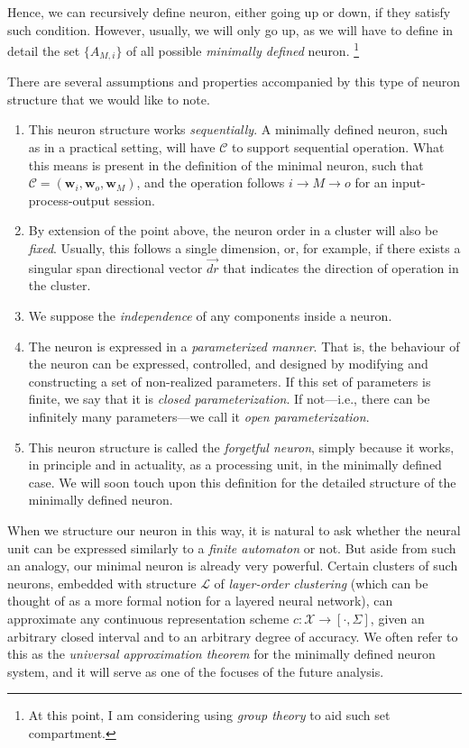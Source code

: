 

Hence, we can recursively define neuron, either going up or down, if they satisfy such condition. However, usually, we will only go up, as we will have to define in detail the set $\{ A_{M,i} \}$ of all possible \textit{minimally defined} neuron. \footnote{At this point, I am considering using \textit{group theory} to aid such set compartment.}

There are several assumptions and properties accompanied by this type of neuron structure that we would like to note.
\begin{enumerate}
    \item This neuron structure works \textit{sequentially}. A minimally defined neuron, such as in a practical setting, will have $\mathcal{C}$ to support sequential operation. What this means is present in the definition of the minimal neuron, such that $\mathcal{C} = (\mathbf{w}_{i}, \mathbf{w}_{o}, \mathbf{w}_{M})$, and the operation follows $i \to M \to o$ for an input-process-output session.
    
    \item By extension of the point above, the neuron order in a cluster will also be \textit{fixed}. Usually, this follows a single dimension, or, for example, if there exists a singular span directional vector $\vec{dr}$ that indicates the direction of operation in the cluster.
    
    \item We suppose the \textit{independence} of any components inside a neuron.
    
    \item The neuron is expressed in a \textit{parameterized manner}. That is, the behaviour of the neuron can be expressed, controlled, and designed by modifying and constructing a set of non-realized parameters. If this set of parameters is finite, we say that it is \textit{closed parameterization}. If not—i.e., there can be infinitely many parameters—we call it \textit{open parameterization}.
    
    \item This neuron structure is called the \textit{forgetful neuron}, simply because it works, in principle and in actuality, as a processing unit, in the minimally defined case. We will soon touch upon this definition for the detailed structure of the minimally defined neuron.
\end{enumerate}

When we structure our neuron in this way, it is natural to ask whether the neural unit can be expressed similarly to a \textit{finite automaton} or not. But aside from such an analogy, our minimal neuron is already very powerful. Certain clusters of such neurons, embedded with structure $\mathcal{L}$ of \textit{layer-order clustering} (which can be thought of as a more formal notion for a layered neural network), can approximate any continuous representation scheme $c: \mathcal{X} \to [\cdot, \Sigma]$, given an arbitrary closed interval and to an arbitrary degree of accuracy. We often refer to this as the \textit{universal approximation theorem} for the minimally defined neuron system, and it will serve as one of the focuses of the future analysis.


